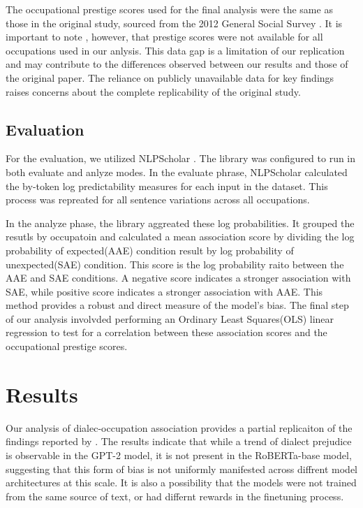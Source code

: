 \documentclass[11pt]{article}
\begin{document}
The occupational prestige scores used for the final analysis were the same as those in the original study, sourced from the 2012 General Social Survey \citep{smith_measuring_2014}. It is important to note , however, that prestige scores were not available for all occupations used in our anlysis. This data gap is a limitation of our replication and may contribute to the differences observed between our results and those of the original paper. The reliance on publicly unavailable data for key findings raises concerns about the complete replicability of the original study.

\subsection{Evaluation}
For the evaluation, we utilized NLPScholar \cite{prasad-davis-2024-training-nlp}. The library was configured to run in both evaluate and anlyze modes. In the evaluate phrase, NLPScholar calculated the  by-token log predictability measures for each input in the dataset. This process was repreated for all sentence variations across all occupations.

In the analyze phase, the library aggreated these log probabilities. It grouped the resutls by occupatoin and calculated a mean association score by dividing the log probability of expected(AAE) condition result by log probability of unexpected(SAE) condition. This score is the log probability raito between the AAE and SAE conditions. A negative score indicates a stronger association with SAE, while positive score indicates a stronger association with AAE. This method provides a robust and direct measure of the model's bias. The final step of our analysis involvded performing an Ordinary Least Squares(OLS) linear regression to test for a correlation between these association scores and the occupational prestige scores.

\section{Results}

Our analysis of dialec-occupation association provides a partial replicaiton of the findings reported by \citet{hofmann_dialect_2024}. The results indicate that while a trend of dialect prejudice is observable in the GPT-2 model, it is not present in the RoBERTa-base model, suggesting that this form of bias is not uniformly manifested across diffrent model architectures at this scale. It is also a possibility that the models were not trained from the same source of text, or had differnt rewards in the finetuning process.
\end{document}
